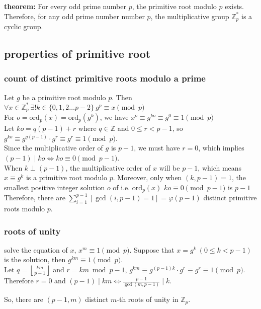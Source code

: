 \documentclass{article}
\newcommand{\ZZ}{\mathbb{Z}}
\newcommand{\floor}[1]{\left\lfloor{#1}\right\rfloor}
\newcommand{\ord}{\mathrm{ord}}
\begin{document}
\noindent \textbf{theorem: }For every odd prime number $p$, the primitive root modulo $p$ exists.\\
Therefore, for any odd prime number number $p$, the multiplicative group $\ZZ_p^\ast$ is a cyclic group.

\subsection{properties of primitive root}

\subsubsection{count of distinct primitive roots modulo a prime}

Let $g$ be a primitive root modulo $p$.
Then $\forall x\in \ZZ_p^\ast\ \exists!k\in\{0,1,2\ldots p-2\}\ g^p\equiv x\pmod p$\\
For $o=\ord_p(x)=\ord_p(g^k)$, we have
$x^o\equiv g^{ko}\equiv g^{0}\equiv 1\pmod p$\\
Let $ko=q(p-1)+r$ where $q\in \ZZ$ and $0\leq r<p-1$, 
so $g^{ko}\equiv g^{q(p-1)}\cdot g^{r}\equiv g^r\equiv 1\pmod p$.\\
Since the multiplicative order of $g$ is $p-1$, we must have $r=0$,
which implies $(p-1)\mid ko\iff ko\equiv 0\pmod{p-1}$.\\

When $k\perp (p-1)$, the multiplicative order of $x$ will be $p-1$, which means $x\equiv g^k$ is a primitive root modulo $p$.
Moreover, only when $(k,p-1)=1$, the smallest positive integer solution $o$ of i.e. $\ord_p(x)$ $ko\equiv 0\pmod {p-1}$ is $p-1$\\
Therefore, there are $\sum_{i=1}^{p-1}[\gcd(i,p-1)=1]=\varphi(p-1)$ distinct primitive roots modulo $p$.

\subsubsection{roots of unity}

solve the equation of $x$, $x^m \equiv 1\pmod p$.
Suppose that $x=g^k\ (0\leq k<p-1)$ is the solution, then $g^{km}\equiv 1\pmod p$.\\
Let $q=\floor{\frac{km}{p-1}}$ and $r=km\bmod {p-1}$, 
$g^{km}\equiv g^{(p-1)k}\cdot g^r\equiv g^r\equiv 1\pmod p$.\\
Therefore $r=0$ and $(p-1)\mid km\iff \frac{p-1}{\gcd(m,p-1)}\mid k$.

So, there are $(p-1,m)$ distinct $m$-th roots of unity in $\ZZ_p$.
\end{document}
